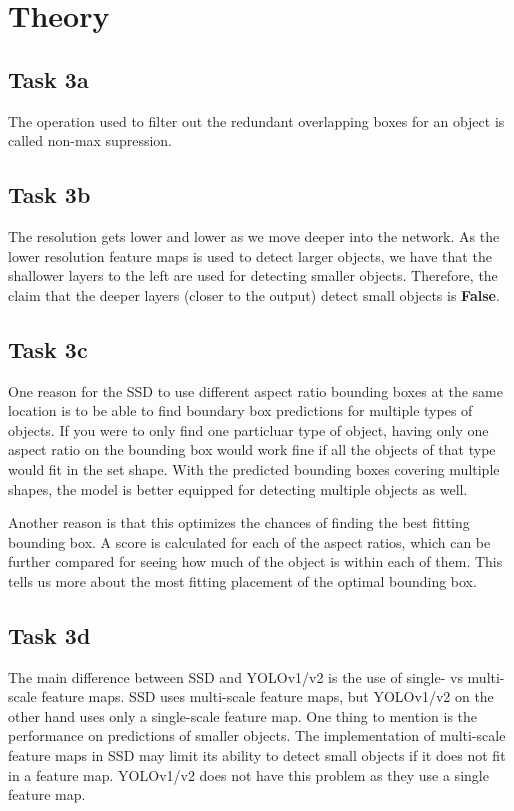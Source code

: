 \clearpage
\section{Theory}
\subsection*{Task 3a}
The operation used to filter out the redundant overlapping boxes for an object is called non-max supression.

\subsection*{Task 3b}
The resolution gets lower and lower as we move deeper into the network.
As the lower resolution feature maps is used to detect larger objects, we have that the shallower layers to the left are used for detecting smaller objects.
Therefore, the claim that the deeper layers (closer to the output) detect small objects is \textbf{False}.

\subsection*{Task 3c}
One reason for the SSD to use different aspect ratio bounding boxes at the same location is to be able to find boundary box predictions for multiple types of objects.
If you were to only find one particluar type of object, having only one aspect ratio on the bounding box would work fine if all the objects of that type would fit in the set shape.
With the predicted bounding boxes covering multiple shapes, the model is better equipped for detecting multiple objects as well.

Another reason is that this optimizes the chances of finding the best fitting bounding box.
A score is calculated for each of the aspect ratios, which can be further compared for seeing how much of the object is within each of them.
This tells us more about the most fitting placement of the optimal bounding box.

\subsection*{Task 3d}
The main difference between SSD and YOLOv1/v2 is the use of single- vs multi-scale feature maps.
SSD uses multi-scale feature maps, but YOLOv1/v2 on the other hand uses only a single-scale feature map.
One thing to mention is the performance on predictions of smaller objects. The implementation of multi-scale feature maps in SSD may limit its ability to detect small objects if it does not fit in a feature map.
YOLOv1/v2 does not have this problem as they use a single feature map.

